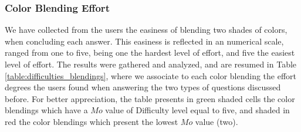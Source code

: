 \subsubsection{Color Blending Effort}
\label{subsubsec:difficulty_rating}
%
We have collected from the users the easiness of blending two shades of colors, when concluding each answer. This easiness is reflected in an numerical scale, ranged from one to five, being one the hardest level of effort, and five the easiest level
of effort. The results were gathered and analyzed, and are resumed in Table \ref{table:difficulties_blendings}, where we associate to each color blending the effort degrees the users found when answering the two types of questions discussed before.
For better appreciation, the table presents in green shaded cells the color blendings which have a $Mo$ value of Difficulty level equal to five, and shaded in red the color blendings which present the lowest $Mo$ value (two). \par
%
